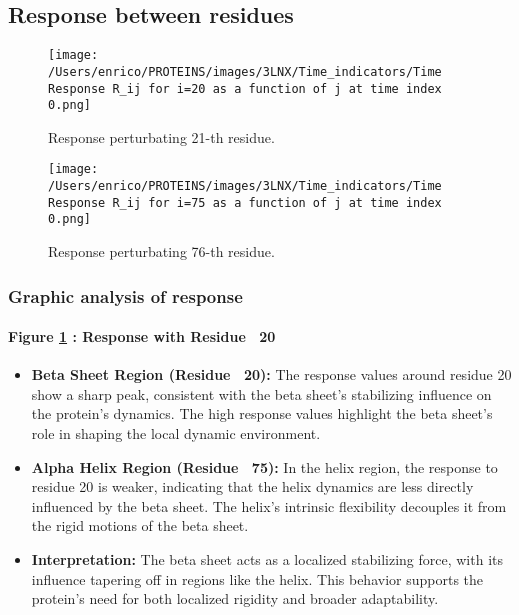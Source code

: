 \documentclass[English, Lau, oneside]{sapthesis}
\begin{document}
\subsection*{Response between residues}
\begin{figure}[h!]
    \centering
    \texttt{[image: /Users/enrico/PROTEINS/images/3LNX/Time\_indicators/Time Response R\_ij for i=20 as a function of j at time index 0.png]}
    \caption{Response perturbating 21-th residue.}
    \label{fig:resp21}
\end{figure}


\begin{figure}[h!]
    \centering
    \texttt{[image: /Users/enrico/PROTEINS/images/3LNX/Time\_indicators/Time Response R\_ij for i=75 as a function of j at time index 0.png]}
    \caption{Response perturbating 76-th residue.}
    \label{fig:resp76}
\end{figure}
\subsubsection*{Graphic analysis of response}
\paragraph{Figure \ref{fig:resp21} : Response with Residue ~20}
\begin{itemize}
    \item \textbf{Beta Sheet Region (Residue ~20):} The response values around residue 20 show a sharp peak, consistent with the beta sheet's stabilizing influence on the protein's dynamics. The high response values highlight the beta sheet’s role in shaping the local dynamic environment.
    \item \textbf{Alpha Helix Region (Residue ~75):} In the helix region, the response to residue 20 is weaker, indicating that the helix dynamics are less directly influenced by the beta sheet. The helix's intrinsic flexibility decouples it from the rigid motions of the beta sheet.
    \item \textbf{Interpretation:} The beta sheet acts as a localized stabilizing force, with its influence tapering off in regions like the helix. This behavior supports the protein's need for both localized rigidity and broader adaptability.
\end{itemize}
\end{document}
